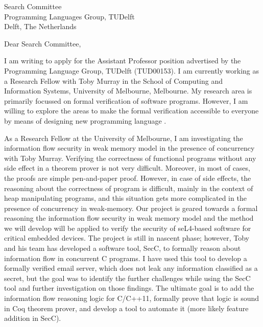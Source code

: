 \documentclass{letter}
\begin{document}
\begin{letter}{Search Committee\\
Programming Languages Group, TUDelft\\
Delft, The Netherlands}


\opening{Dear Search Committee,}


I am writing to apply for the Assistant Professor position advertised by the Programming Language Group, TUDelft (TUD00153). 
I am currently working as a Research Fellow with Toby Murray in the School of Computing and Information Systems, University 
of Melbourne, Melbourne. My research area is primarily focussed on formal verification of software programs.   
However, I am willing to explore the areas to make the formal verification accessible to everyone by means of 
designing new programming language . 

As a Research Fellow at the University of Melbourne, I am investigating the 
information flow security in weak memory model in the presence of concurrency with Toby Murray. 
Verifying the correctness of functional programs without any side effect in a theorem prover 
is not very difficult. Moreover, in most of cases, the proofs are simple pen-and-paper proof. 
However, in case of side effects, the reasoning about the correctness of program is
difficult, mainly in the context of heap manipulating programs, and this situation gets 
more complicated in the presence of concurrency in weak-memory. 
Our project is geared 
towards a formal reasoning the information flow security in weak memory model and 
the method we will develop will be applied to verify the security of seL4-based 
software for critical embedded devices.  The project is still in nascent phase; however, 
Toby and his team  has developed a software tool, SecC, to formally reason about information flow in 
concurrent C programs.  I have used this tool to develop a formally verified email server, which does not leak any information
classified as a secret, but the goal  was to identify the further challenges while using the SecC tool and 
further investigation on those findings. 
The ultimate goal is to add the  information flow reasoning logic for C/C++11, formally 
prove that logic is sound  in Coq theorem prover, and develop a tool to automate it (more likely feature addition in SecC). 



\end{letter}
\end{document}
